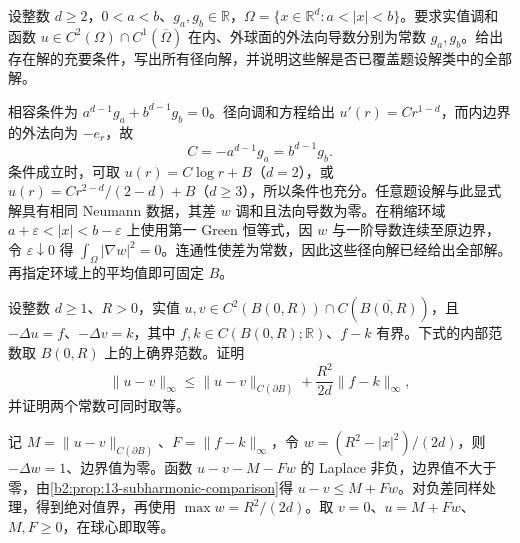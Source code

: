 \begin{exercise}\label{b2:ex:13-annulus-neumann}
设整数 \(d\geq2\)，\(0<a<b\)、\(g_a,g_b\in\mathbb R\)，\(\Omega=\{x\in\mathbb R^d:a<|x|<b\}\)。要求实值调和函数 \(u\in C^2(\Omega)\cap C^1(\overline\Omega)\) 在内、外球面的外法向导数分别为常数 \(g_a,g_b\)。给出存在解的充要条件，写出所有径向解，并说明这些解是否已覆盖题设解类中的全部解。
\end{exercise}
\begin{solution}
相容条件为 \(a^{d-1}g_a+b^{d-1}g_b=0\)。径向调和方程给出 \(u'(r)=Cr^{1-d}\)，而内边界的外法向为 \(-e_r\)，故
\[
 C=-a^{d-1}g_a=b^{d-1}g_b.
\]
条件成立时，可取 \(u(r)=C\log r+B\)（\(d=2\)），或 \(u(r)=C r^{2-d}/(2-d)+B\)（\(d\geq3\)），所以条件也充分。任意题设解与此显式解具有相同 Neumann 数据，其差 \(w\) 调和且法向导数为零。在稍缩环域 \(a+\varepsilon<|x|<b-\varepsilon\) 上使用第一 Green 恒等式，因 \(w\) 与一阶导数连续至原边界，令 \(\varepsilon\downarrow0\) 得 \(\int_\Omega|\nabla w|^2=0\)。连通性使差为常数，因此这些径向解已经给出全部解。再指定环域上的平均值即可固定 \(B\)。
\end{solution}

\begin{exercise}\label{b2:ex:13-source-stability}
设整数 \(d\geq1\)、\(R>0\)，实值 \(u,v\in C^2(B(0,R))\cap C(\overline{B(0,R)})\)，且 \(-\Delta u=f\)、\(-\Delta v=k\)，其中 \(f,k\in C(B(0,R);\mathbb R)\)、\(f-k\) 有界。下式的内部范数取 \(B(0,R)\) 上的上确界范数。证明
\[
 \|u-v\|_\infty\leq
 \|u-v\|_{C(\partial B)}+\dfrac{R^2}{2d}\|f-k\|_\infty,
\]
并证明两个常数可同时取等。
\end{exercise}
\begin{solution}
记 \(M=\|u-v\|_{C(\partial B)}\)、\(F=\|f-k\|_\infty\)，令 \(w=(R^2-|x|^2)/(2d)\)，则 \(-\Delta w=1\)、边界值为零。函数 \(u-v-M-Fw\) 的 Laplace 非负，边界值不大于零，由\cref{b2:prop:13-subharmonic-comparison}得 \(u-v\leq M+Fw\)。对负差同样处理，得到绝对值界，再使用 \(\max w=R^2/(2d)\)。取 \(v=0\)、\(u=M+Fw\)、\(M,F\geq0\)，在球心即取等。
\end{solution}

